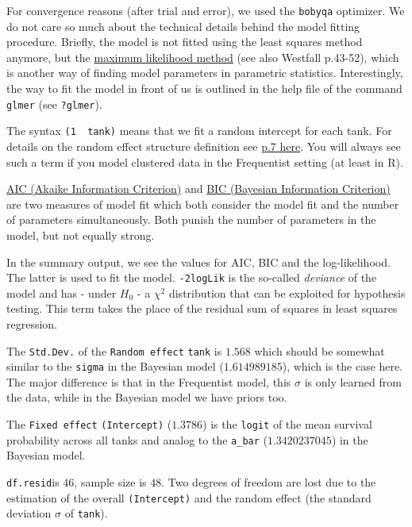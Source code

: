 \documentclass[
]{article}
\begin{document}
For convergence reasons (after trial and error), we used the
\texttt{bobyqa} optimizer. We do not care so much about the technical
details behind the model fitting procedure. Briefly, the model is not
fitted using the least squares method anymore, but the
\href{https://www.youtube.com/watch?v=XepXtl9YKwc&ab_channel=StatQuestwithJoshStarmer}{maximum
likelihood method} (see also Westfall p.43-52), which is another way of
finding model parameters in parametric statistics. Interestingly, the
way to fit the model in front of us is outlined in the help file of the
command \texttt{glmer} (see \texttt{?glmer}).

The syntax \texttt{(1\ \textbar{}\ tank)} means that we fit a random
intercept for each tank. For details on the random effect structure
definition see
\href{https://cran.r-project.org/web/packages/lme4/vignettes/lmer.pdf}{p.7
here}. You will always see such a term if you model clustered data in
the Frequentist setting (at least in R).

\href{https://en.wikipedia.org/wiki/Akaike_information_criterion}{AIC
(Akaike Information Criterion)} and
\href{https://en.wikipedia.org/wiki/Bayesian_information_criterion}{BIC
(Bayesian Information Criterion)} are two measures of model fit which
both consider the model fit and the number of parameters simultaneously.
Both punish the number of parameters in the model, but not equally
strong.

In the summary output, we see the values for AIC, BIC and the
log-likelihood. The latter is used to fit the model. \texttt{-2logLik}
is the so-called \emph{deviance} of the model and has - under \(H_0\) -
a \(\chi^2\) distribution that can be exploited for hypothesis testing.
This term takes the place of the residual sum of squares in least
squares regression.

The \texttt{Std.Dev.} of the \texttt{Random\ effect} \texttt{tank} is
\(1.568\) which should be somewhat similar to the \texttt{sigma} in the
Bayesian model (\(1.614989185\)), which is the case here. The major
difference is that in the Frequentist model, this \(\sigma\) is only
learned from the data, while in the Bayesian model we have priors too.

The \texttt{Fixed\ effect} \texttt{(Intercept)} (\(1.3786\)) is the
\texttt{logit} of the mean survival probability across all tanks and
analog to the \texttt{a\_bar} (\(1.3420237045\)) in the Bayesian model.

\texttt{df.resid}is \(46\), sample size is \(48\). Two degrees of
freedom are lost due to the estimation of the overall
\texttt{(Intercept)} and the random effect (the standard deviation
\(\sigma\) of \texttt{tank}).
\end{document}

